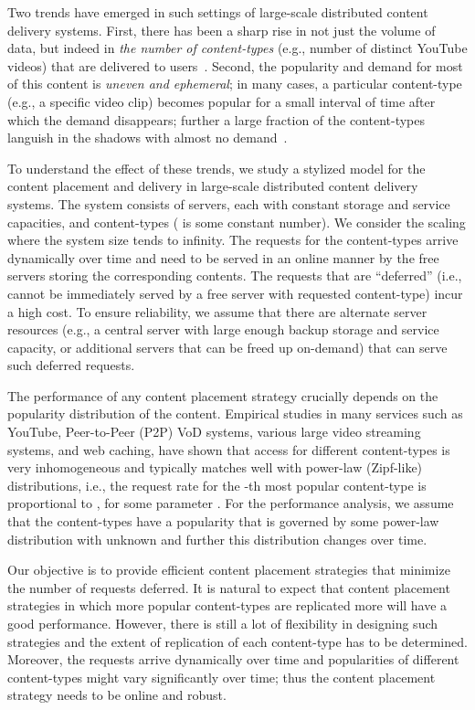 \documentclass[10pt, conference, letterpaper]{IEEEtran}
\begin{document}
Two trends have emerged in such settings of large-scale distributed
content delivery systems. First, there has been a sharp rise in not
just the volume of data, but indeed in \textit{the number
	of content-types} (e.g., number of distinct YouTube videos) that are
delivered to users~\cite{Youtube}. Second, the popularity and demand
for most of this content is \textit{uneven and ephemeral}; in many
cases, a particular content-type (e.g., a specific video clip) becomes
popular for a small interval of time after which the demand
disappears; further a large fraction of the content-types languish in
the shadows with almost no demand~\cite{Gill07,temporal13}.

To understand the effect of these trends, we study a stylized model
for the content placement and delivery in large-scale distributed
content delivery systems. The system consists of  servers, each
with constant storage and service capacities, and 
content-types ( is some constant number). We consider the
scaling where the system size  tends to infinity. The requests for
the content-types arrive dynamically over time and need to be served
in an online manner by the free servers storing the corresponding
contents. The requests that are ``deferred'' (i.e., cannot be
immediately served by a free server with requested content-type) incur
a high cost. To ensure reliability, we assume that there are
alternate server resources (e.g., a central server with large enough
backup storage and service capacity, or additional servers that can be
freed up on-demand) that can serve such deferred requests.

The performance of any content placement strategy crucially depends on
the popularity distribution of the content. Empirical studies in many
services such as YouTube, Peer-to-Peer (P2P) VoD systems, various
large video streaming systems, and web caching,
\cite{Gill07,BC99,YZ06,IRF04,VA02} have shown that access for
different content-types is very inhomogeneous and typically matches
well with power-law (Zipf-like) distributions, i.e., the request rate
for the -th most popular content-type is proportional to ,
for some parameter .  For the performance analysis, we assume
that the content-types have a popularity that is governed by some
power-law distribution with unknown  and further this
distribution changes over time.

Our objective is to provide efficient content placement strategies
that minimize the number of requests deferred. It is natural to expect
that content placement strategies in which more popular content-types
are replicated more will have a good performance. However, there is
still a lot of flexibility in designing such strategies and the extent
of replication of each content-type has to be determined.  Moreover, the
requests arrive dynamically over time and popularities of different
content-types might vary significantly over time; thus the content
placement strategy needs to be online and robust.
\end{document}
